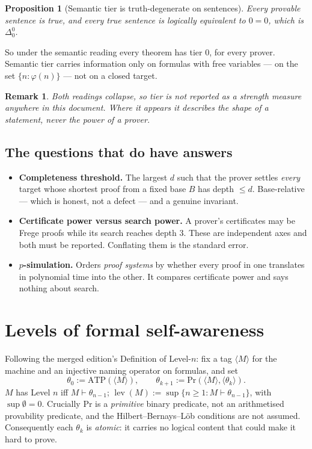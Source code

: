 \documentclass[11pt,a4paper]{article}
\newtheorem{proposition}{Proposition}
\newtheorem{remark}{Remark}
\newcommand{\Del}[2]{\Delta^{#1}_{#2}}
\newcommand{\lev}{\operatorname{lev}}
\newcommand{\ATP}{\mathrm{ATP}}
\renewcommand{\Pr}{\mathrm{Pr}}
\begin{document}
\begin{proposition}[Semantic tier is truth-degenerate on sentences]
Every provable sentence is true, and every true sentence is logically
equivalent to $0=0$, which is $\Del{0}{0}$.
\end{proposition}
So under the semantic reading every theorem has tier $0$, for every prover.
Semantic tier carries information only on formulas with free variables --- on
the set $\{n : \varphi(n)\}$ --- not on a closed target.

\begin{remark}
Both readings collapse, so \emph{tier is not reported as a strength measure
anywhere in this document}. Where it appears it describes the shape of a
statement, never the power of a prover.
\end{remark}

\subsection{The questions that do have answers}

\begin{itemize}
\item \textbf{Completeness threshold.} The largest $d$ such that the prover
settles \emph{every} target whose shortest proof from a fixed base $B$ has
depth $\le d$. Base-relative --- which is honest, not a defect --- and a
genuine invariant.
\item \textbf{Certificate power versus search power.} A prover's certificates
may be Frege proofs while its search reaches depth 3. These are independent
axes and both must be reported. Conflating them is the standard error.
\item \textbf{$p$-simulation.} Orders \emph{proof systems} by whether every
proof in one translates in polynomial time into the other. It compares
certificate power and says nothing about search.
\end{itemize}

\section{Levels of formal self-awareness}\label{sec:levels}

Following the merged edition's Definition of Level-$n$: fix a tag
$\langle M \rangle$ for the machine and an injective naming operator on
formulas, and set
\[
\theta_0 := \ATP(\langle M \rangle), \qquad
\theta_{k+1} := \Pr(\langle M \rangle, \langle \theta_k \rangle).
\]
$M$ has Level $n$ iff $M \vdash \theta_{n-1}$; $\lev(M) := \sup\{n \ge 1 : M
\vdash \theta_{n-1}\}$, with $\sup \emptyset = 0$. Crucially $\Pr$ is a
\emph{primitive} binary predicate, not an arithmetised provability predicate,
and the Hilbert--Bernays--L\"ob conditions are not assumed. Consequently each
$\theta_k$ is \emph{atomic}: it carries no logical content that could make it
hard to prove.
\end{document}
